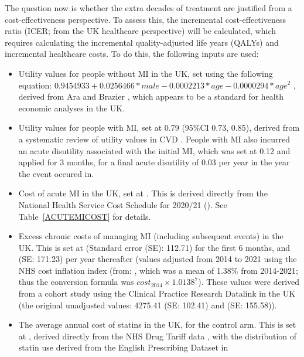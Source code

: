 \documentclass[11pt]{article}
\begin{document}
The question now is whether the extra decades of treatment are justified
from a cost-effectiveness perspective. To assess this, the
incremental cost-effectiveness ratio (ICER; from the UK healthcare perspective) will be calculated, 
which requires calculating the incremental quality-adjusted life years (QALYs)
and incremental healthcare costs. To do this, the following inputs are used:

\begin{itemize}
\item Utility values for people without MI in the UK, set using the following equation: 
\begin{math} 0.9454933 + 0.0256466*male - 0.0002213*age - 0.0000294*age^2 \end{math}
, derived from Ara and Brazier \cite{ARAVIH2010}, 
which appears to be a standard for health economic analyses in the UK. 
\item Utility values for people with MI, set at 0.79 (95\%CI 0.73, 0.85), 
derived from a systematic review of utility values in CVD \cite{BettsHQLO2020}. 
People with MI also incurred an acute disutility associated with the initial MI, which was set at 0.12 \cite{LewisJACCHF2014}
and applied for 3 months, for a final acute disutility of 0.03 per year in the year the event occured in. 
\item Cost of acute MI in the UK, set at . This is derived directly from the National Health
Service Cost Schedule for 2020/21 (\cite{NHSCOST202021}). 
See Table~\ref{ACUTEMICOST} for details. 
\item Excess chronic costs of managing MI (including subsequent events) in the UK. This is set at 
 (Standard error (SE): 112.71) for the first 6 months, and  
(SE: 171.23) per year thereafter (values adjusted from 2014 \textsterling to 2021 \textsterling using the NHS cost inflation index 
(from: \cite{NHSinflation2021}, which was a mean of 1.38\% from 2014-2021; 
thus the conversion formula was \begin{math} cost_{2014} \times 1.0138^7 \end{math}). 
These values were derived from a cohort study using
the Clinical Practice Research Datalink in the UK \cite{DaneseeBMJO2016} 
(the original unadjusted values: 4275.41 (SE: 102.41) and  (SE: 155.58)). 
\item The average annual cost of statins in the UK, for the control arm. This is set at , derived directly from 
the NHS Drug Tariff data \cite{NHSDrugTariff}, with the distribution of statin use derived from the English Prescribing Dataset in

\end{itemize}
\end{document}
